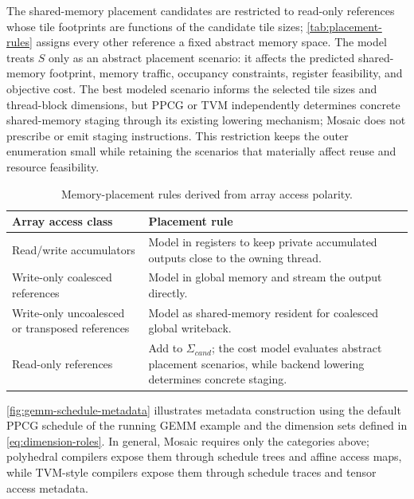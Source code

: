 \documentclass[acmsmall,review,anonymous,screen]{acmart}
\newcommand{\name}{{Mosaic}\xspace}
\begin{document}
The shared-memory placement candidates are restricted to read-only references whose tile footprints are functions of the candidate tile sizes; \autoref{tab:placement-rules} assigns every other reference a fixed abstract memory space. The model treats \(S\) only as an abstract placement scenario: it affects the predicted shared-memory footprint, memory traffic, occupancy constraints, register feasibility, and objective cost. The best modeled scenario informs the selected tile sizes and thread-block dimensions, but PPCG or TVM independently determines concrete shared-memory staging through its existing lowering mechanism; \name does not prescribe or emit staging instructions. This restriction keeps the outer enumeration small while retaining the scenarios that materially affect reuse and resource feasibility.

\begin{table}[tbp]
  \caption{Memory-placement rules derived from array access polarity.}
  \label{tab:placement-rules}
  \centering
  \scriptsize
  \setlength{\tabcolsep}{6pt}
  \renewcommand{\arraystretch}{1.10}
  \begin{tabularx}{0.94\textwidth}{@{}
    >{\raggedright\arraybackslash}p{}
    >{\raggedright\arraybackslash}X
    @{}}
    \toprule
    \textbf{Array access class} & \textbf{Placement rule} \\
    \midrule
    Read/write accumulators &
      Model in registers to keep private accumulated outputs close to the
      owning thread. \\
    Write-only coalesced references &
      Model in global memory and stream the output directly. \\
    Write-only uncoalesced or transposed references &
      Model as shared-memory resident for coalesced global writeback. \\
    Read-only references &
      Add to \(\Sigma_{\mathit{cand}}\); the cost model evaluates abstract
      placement scenarios, while backend lowering determines concrete staging. \\
    \bottomrule
  \end{tabularx}
\end{table}

\autoref{fig:gemm-schedule-metadata} illustrates metadata construction using the default PPCG schedule of the running GEMM example and the dimension sets defined in \autoref{eq:dimension-roles}. In general, \name requires only the categories above; polyhedral compilers expose them through schedule trees and affine access maps, while TVM-style compilers expose them through schedule traces and tensor access metadata.
\end{document}
